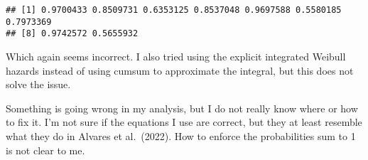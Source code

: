 \documentclass[
]{article}
\newenvironment{Shaded}{\begin{snugshade}}{\end{snugshade}}
\newcommand{\AttributeTok}[1]{\textcolor[rgb]{0.13,0.29,0.53}{#1}}
\newcommand{\CommentTok}[1]{\textcolor[rgb]{0.56,0.35,0.01}{\textit{#1}}}
\newcommand{\ControlFlowTok}[1]{\textcolor[rgb]{0.13,0.29,0.53}{\textbf{#1}}}
\newcommand{\DecValTok}[1]{\textcolor[rgb]{0.00,0.00,0.81}{#1}}
\newcommand{\FunctionTok}[1]{\textcolor[rgb]{0.13,0.29,0.53}{\textbf{#1}}}
\newcommand{\NormalTok}[1]{#1}
\newcommand{\OtherTok}[1]{\textcolor[rgb]{0.56,0.35,0.01}{#1}}
\newcommand{\SpecialCharTok}[1]{\textcolor[rgb]{0.81,0.36,0.00}{\textbf{#1}}}
\begin{document}
\begin{Shaded}
\end{Shaded}

\begin{verbatim}
## [1] 0.9700433 0.8509731 0.6353125 0.8537048 0.9697588 0.5580185 0.7973369
## [8] 0.9742572 0.5655932
\end{verbatim}

Which again seems incorrect. I also tried using the explicit integrated
Weibull hazards instead of using cumsum to approximate the integral, but
this does not solve the issue.

Something is going wrong in my analysis, but I do not really know where
or how to fix it. I'm not sure if the equations I use are correct, but
they at least resemble what they do in Alvares et al.~(2022). How to
enforce the probabilities sum to 1 is not clear to me.
\end{document}
